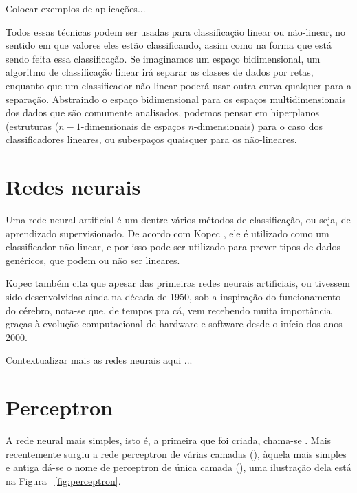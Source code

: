 Colocar exemplos de aplicações...

Todos essas técnicas podem ser usadas para classificação linear ou não-linear, no sentido em que valores eles estão classificando, assim como na forma que está sendo feita essa classificação. Se imaginamos um espaço bidimensional, um algoritmo de classificação linear irá separar as classes de dados por retas, enquanto que um classificador não-linear poderá usar outra curva qualquer para a separação. Abstraindo o espaço bidimensional para os espaços multidimensionais dos dados que são comumente analisados, podemos pensar em hiperplanos (estruturas ($n{-}1$-dimensionais de espaços $n$-dimensionais) para o caso dos classificadores lineares, ou subespaços quaisquer para os não-lineares.

\section{Redes neurais}

Uma rede neural artificial é um dentre vários métodos de classificação, ou seja, de aprendizado supervisionado. De acordo com Kopec \citep{classic}, ele é utilizado como um classificador não-linear, e por isso pode ser utilizado para prever tipos de dados genéricos, que podem ou não ser lineares.

Kopec \citep{classic} também cita que apesar das primeiras redes neurais artificiais, ou  tivessem sido desenvolvidas ainda na década de 1950, sob a inspiração do funcionamento do cérebro, nota-se que, de tempos pra cá, vem recebendo muita importância graças à evolução computacional de hardware e software desde o início dos anos 2000.

Contextualizar mais as redes neurais aqui ...

\section{Perceptron}

A rede neural mais simples, isto é, a primeira que foi criada, chama-se . Mais recentemente surgiu a rede perceptron de várias camadas (), àquela mais simples e antiga dá-se o nome de perceptron de única camada (), uma ilustração dela está na Figura ~\ref{fig:perceptron}. 

